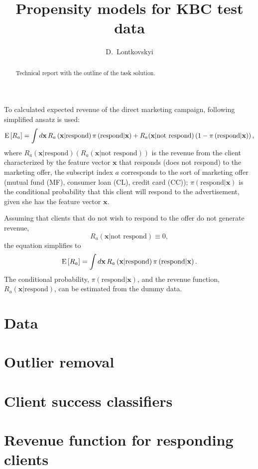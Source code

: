 \documentclass[14pt]{scrartcl}
\title{Propensity models for KBC test data}
\author{D.~Lontkovskyi}
\begin{document}
\maketitle

\begin{abstract}
Technical report with the outline of the task solution.
\end{abstract}

To calculated expected revenue of the direct marketing campaign, following simplified ansatz is used:
\begin{equation}
    \textmd{E}\left[R_a\right] =  \int d\mathbf{x}\,R_a \left( \textbf{x}|\textrm{respond} \right) \pi\left(\textrm{respond}|\textbf{x}\right) + 
                                                    R_a(\textbf{x}|\textrm{not respond}) \left(1 - \pi\left(\textrm{respond}|\textbf{x}\right) \right),
\end{equation}
where $R_a \left( \textbf{x}|\textrm{respond} \right) \left(R_a \left( \textbf{x}|\textrm{not respond} \right)\right)$ is the revenue from the client characterized
by the feature vector $\textbf{x}$ that responds (does not respond) to the marketing offer, the subscript index $a$ corresponds to the sort of marketing offer (mutual fund (MF), consumer loan (CL), credit card (CC)); $\pi\left(\textrm{respond}|\textbf{x}\right)$ is the conditional probability that 
this client will respond to the advertisement, given she has the feature vector $\textbf{x}$.

Assuming that clients that do not wish to respond to the offer do not generate revenue, 
\begin{equation}
    R_a(\textbf{x}|\textrm{not respond}) \equiv 0,
\end{equation} 
the equation simplifies to
\begin{equation}
    \textmd{E}\left[R_a\right] =  \int d\mathbf{x}\,R_a \left( \textbf{x}|\textrm{respond} \right) \pi\left(\textrm{respond}|\textbf{x}\right).
\end{equation}
The conditional probability, $\pi\left(\textrm{respond}|\textbf{x}\right)$, and the revenue function, $R_a \left( \textbf{x}|\textrm{respond} \right)$, can be estimated from the dummy data.

\section{Data}
\section{Outlier removal}
\section{Client success classifiers}
\section{Revenue function for responding clients}
\end{document}
